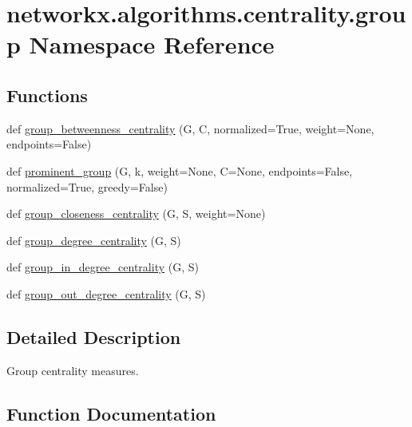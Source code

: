 \hypertarget{namespacenetworkx_1_1algorithms_1_1centrality_1_1group}{}\section{networkx.\+algorithms.\+centrality.\+group Namespace Reference}
\label{namespacenetworkx_1_1algorithms_1_1centrality_1_1group}
\subsection*{Functions}
\begin{DoxyCompactItemize}
\item 
def \hyperlink{namespacenetworkx_1_1algorithms_1_1centrality_1_1group_ab76649fd35768cdb81c93b832b2f9134}{group\+\_\+betweenness\+\_\+centrality} (G, C, normalized=True, weight=None, endpoints=False)
\item 
def \hyperlink{namespacenetworkx_1_1algorithms_1_1centrality_1_1group_a8fdb8921dcebe00f23f48920eeec5259}{prominent\+\_\+group} (G, k, weight=None, C=None, endpoints=False, normalized=True, greedy=False)
\item 
def \hyperlink{namespacenetworkx_1_1algorithms_1_1centrality_1_1group_a2324c06b3f7319f1c38d129109e05513}{group\+\_\+closeness\+\_\+centrality} (G, S, weight=None)
\item 
def \hyperlink{namespacenetworkx_1_1algorithms_1_1centrality_1_1group_adced651bd943e084ef9016af4ccce328}{group\+\_\+degree\+\_\+centrality} (G, S)
\item 
def \hyperlink{namespacenetworkx_1_1algorithms_1_1centrality_1_1group_af4a95d706740e3f3c214671da94be2d5}{group\+\_\+in\+\_\+degree\+\_\+centrality} (G, S)
\item 
def \hyperlink{namespacenetworkx_1_1algorithms_1_1centrality_1_1group_a9858fd832390e48c10424a763d2b78ef}{group\+\_\+out\+\_\+degree\+\_\+centrality} (G, S)
\end{DoxyCompactItemize}


\subsection{Detailed Description}
\begin{DoxyVerb}Group centrality measures.\end{DoxyVerb}
 

\subsection{Function Documentation}
\mbox{\label{namespacenetworkx_1_1algorithms_1_1centrality_1_1group_ab76649fd35768cdb81c93b832b2f9134}} 

